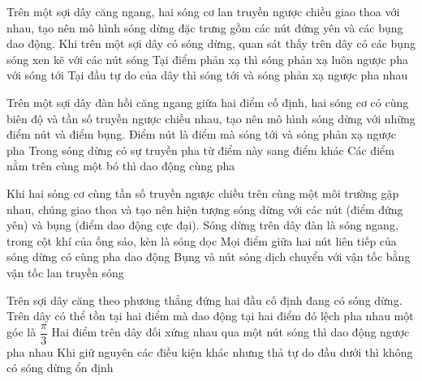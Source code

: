 \PhanII
\setcounter{ex}{0}
\begin{ex}
Trên một sợi dây căng ngang, hai sóng cơ lan truyền ngược chiều giao thoa với nhau, tạo nên mô hình sóng dừng đặc trưng gồm các nút đứng yên và các bụng dao động.
{\True Khi trên một sợi dây có sóng dừng, quan sát thấy trên dây có các bụng sóng xen kẽ với các nút sóng}
{Tại điểm phản xạ thì sóng phản xạ luôn ngược pha với sóng tới}
{Tại đầu tự do của dây thì sóng tới và sóng phản xạ ngược pha nhau} 
\loigiai{
\begin{itemchoice}
\itemch
\itemch
\itemch
\itemch
\end{itemchoice}
}
\end{ex} 
\begin{ex}
Trên một sợi dây đàn hồi căng ngang giữa hai điểm cố định, hai sóng cơ có cùng biên độ và tần số truyền ngược chiều nhau, tạo nên mô hình sóng dừng với những điểm nút và điểm bụng.
{\True Điểm nút là điểm mà sóng tới và sóng phản xạ ngược pha}
{Trong sóng dừng có sự truyền pha từ điểm này sang điểm khác}
{\True Các điểm nằm trên cùng một bó thì dao động cùng pha}
\loigiai{
\begin{itemchoice}
\itemch
\itemch
\itemch
\itemch
\end{itemchoice}
}
\end{ex} 
\begin{ex}
Khi hai sóng cơ cùng tần số truyền ngược chiều trên cùng một môi trường gặp nhau, chúng giao thoa và tạo nên hiện tượng sóng dừng với các nút (điểm đứng yên) và bụng (điểm dao động cực đại).
{\True Sóng dừng trên dây đàn là sóng ngang, trong cột khí của ống sáo, kèn là sóng dọc}
{\True Mọi điểm giữa hai nút liên tiếp của sóng dừng có cùng pha dao động}
{Bụng và nút sóng dịch chuyển với vận tốc bằng vận tốc lan truyền sóng}
\loigiai{
\begin{itemchoice}
\itemch
\itemch
\itemch
\itemch
\end{itemchoice}
}
\end{ex} 
\begin{ex}
Trên sợi dây căng theo phương thẳng đứng hai đầu cố định đang có sóng dừng.
{Trên dây có thể tồn tại hai điểm mà dao động tại hai điểm đó lệch pha nhau một góc là $\dfrac{\pi}{3}$}
{\True Hai điểm trên dây đối xứng nhau qua một nút sóng thì dao động ngược pha nhau}
{\True Khi giữ nguyên các điều kiện khác nhưng thả tự do đầu dưới thì không có sóng dừng ổn định} 
\loigiai{
\begin{itemchoice}
\itemch
\itemch
\itemch
\itemch
\end{itemchoice}
}
\end{ex} 

